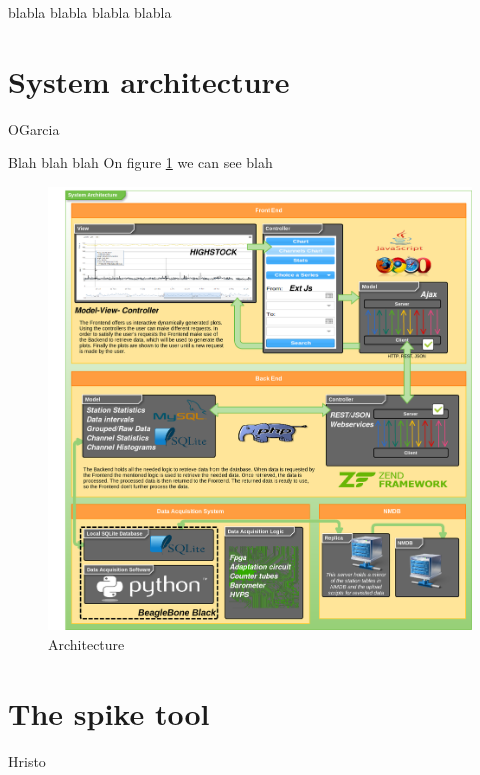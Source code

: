 \documentclass[a4paper]{jpconf}
\begin{document}
blabla \cite{Garcia2014}
blabla \cite{Medina2013}
blabla \cite{NMDB2011}
blabla \cite{Forbush1938}

\section{System architecture}

\huge{OGarcia}


	Blah blah blah
	On figure \ref{fig:arch} we can see blah

	\begin{figure}[h]
		\centering
		\includegraphics[keepaspectratio, width=1\textwidth]{./resources/Architecture.png}
		\caption{Architecture}
		\label{fig:arch}
	\end{figure}

\section{The spike tool}

\huge{Hristo}

\end{document}
